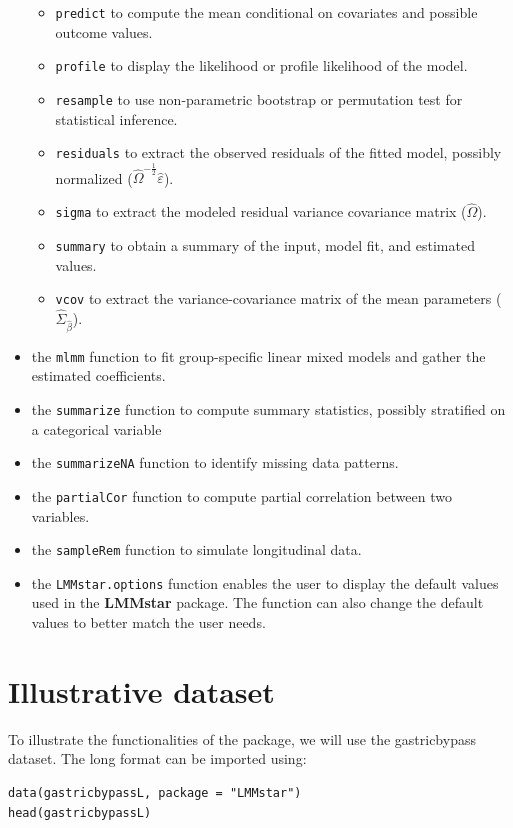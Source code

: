 \documentclass[12pt]{article}
\begin{document}
\begin{itemize}
\begin{itemize}
\item \texttt{predict} to compute the mean conditional on covariates and
possible outcome values.
\item \texttt{profile} to display the likelihood or profile likelihood of the model.
\item \texttt{resample} to use non-parametric bootstrap or permutation test for statistical inference.
\item \texttt{residuals} to extract the observed residuals of the fitted
model, possibly normalized
(\(\widehat{\Omega}^{-\frac{1}{2}}\widehat{\varepsilon}\)).
\item \texttt{sigma} to extract the modeled residual variance covariance matrix (\(\widehat{\Omega}\)).
\item \texttt{summary} to obtain a summary of the input, model fit, and estimated values.
\item \texttt{vcov} to extract the variance-covariance matrix of the mean
parameters (\(\widehat{\Sigma}_{\widehat{\beta}}\)).
\end{itemize}
\item the \texttt{mlmm} function to fit group-specific linear mixed models and
gather the estimated coefficients.
\item the \texttt{summarize} function to compute summary statistics, possibly
stratified on a categorical variable
\item the \texttt{summarizeNA} function to identify missing data patterns.
\item the \texttt{partialCor} function to compute partial correlation between two variables.
\item the \texttt{sampleRem} function to simulate longitudinal data.
\item the \texttt{LMMstar.options} function enables the user to display the
default values used in the \textbf{LMMstar} package. The function
can also change the default values to better match the user needs.
\end{itemize}


\clearpage

\section{Illustrative dataset}
\label{sec:org3113bf3}
To illustrate the functionalities of the package, we will use the
gastricbypass dataset. The long format can be imported using:
\lstset{language=r,label= ,caption= ,captionpos=b,numbers=none}
\begin{lstlisting}
data(gastricbypassL, package = "LMMstar")
head(gastricbypassL)
\end{lstlisting}
\end{document}
